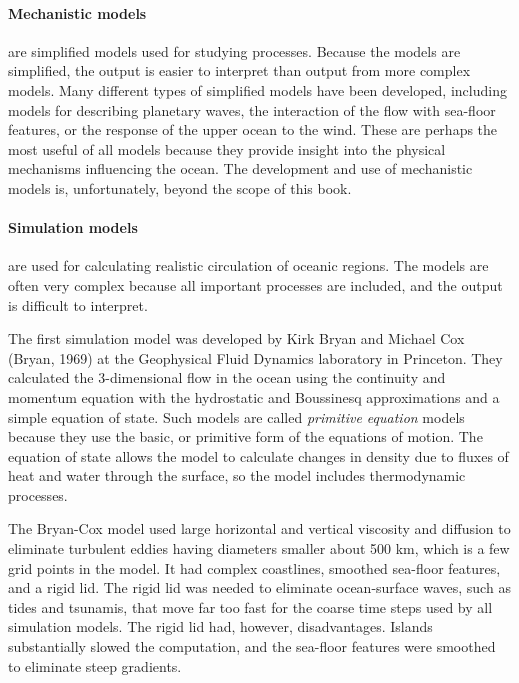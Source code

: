 \paragraph{Mechanistic models} are simplified models used for studying processes. Because the models are
simplified, the output is easier to interpret than output from more
complex models. Many different types of simplified models have been
developed, including models for describing planetary waves, the
interaction of the flow with sea-floor features, or the response of
the upper ocean to the wind. These are perhaps the most useful of all
models because they provide insight into the physical mechanisms
influencing the ocean. The development and use of mechanistic models
is, unfortunately, beyond the scope of this book.

\paragraph{Simulation models} are used for calculating realistic circulation
of oceanic
regions. The models are often very complex because all important
processes are included, and the output is difficult to interpret.

The first simulation model
was developed by Kirk Bryan and Michael Cox (Bryan, 1969) at the
Geophysical Fluid Dynamics laboratory in Princeton. They calculated
the 3-dimensional flow in the ocean using the continuity and momentum
equation with the hydrostatic and Boussinesq
approximations and a simple equation
of state. Such models are called \textit{primitive equation} models
because they use the basic, or primitive form of the equations of
motion. The equation of state allows the model to calculate changes in
density due to fluxes of heat and water through the surface, so the
model includes thermodynamic processes.

The Bryan-Cox model used large horizontal and vertical viscosity and
diffusion to eliminate turbulent eddies having diameters smaller about
500 km, which is a few grid points in the model. It had complex
coastlines, smoothed sea-floor features, and a rigid lid. The rigid
lid was needed to eliminate ocean-surface waves, such as tides and
tsunamis, that move far too fast for the coarse time
steps used by all simulation models. The rigid lid had, however,
disadvantages. Islands substantially slowed the computation, and the
sea-floor features were smoothed to eliminate steep gradients.

